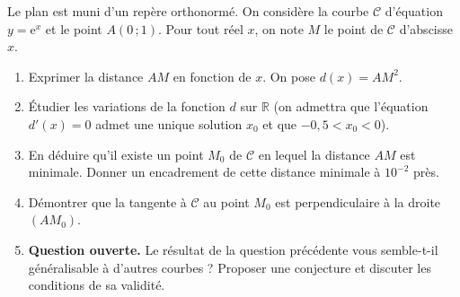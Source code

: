 \documentclass[11pt]{article}
\begin{document}
\begin{exercice}
Le plan est muni d'un repère orthonormé. On considère la courbe $\mathcal{C}$ d'équation $y = \mathrm{e}^{x}$ et le point $A(0\,;1)$. Pour tout réel $x$, on note $M$ le point de $\mathcal{C}$ d'abscisse $x$.
\begin{enumerate}
\item Exprimer la distance $AM$ en fonction de $x$. On pose $d(x) = AM^2$.
\item Étudier les variations de la fonction $d$ sur $\mathbb{R}$ (on admettra que l'équation $d'(x)=0$ admet une unique solution $x_0$ et que $-0{,}5 < x_0 < 0$).
\item En déduire qu'il existe un point $M_0$ de $\mathcal{C}$ en lequel la distance $AM$ est minimale. Donner un encadrement de cette distance minimale à $10^{-2}$ près.
\item Démontrer que la tangente à $\mathcal{C}$ au point $M_0$ est perpendiculaire à la droite $(AM_0)$.
\item \textbf{Question ouverte.} Le résultat de la question précédente vous semble-t-il généralisable à d'autres courbes ? Proposer une conjecture et discuter les conditions de sa validité.
\end{enumerate}
\end{exercice}
\end{document}
